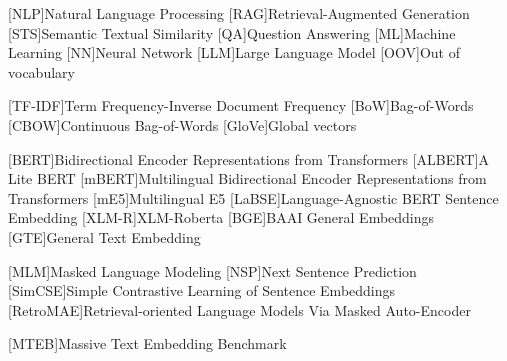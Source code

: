 
\begin{acronym}
  [NLP]{Natural Language Processing}
  [RAG]{Retrieval-Augmented Generation}
  [STS]{Semantic Textual Similarity}
  [QA]{Question Answering}
  [ML]{Machine Learning}
  [NN]{Neural Network}
  [LLM]{Large Language Model}
  [OOV]{Out of vocabulary}

  [TF-IDF]{Term Frequency-Inverse Document Frequency}
  [BoW]{Bag-of-Words}
  [CBOW]{Continuous Bag-of-Words}
  [GloVe]{Global vectors}
  
  [BERT]{Bidirectional Encoder Representations from Transformers}
  [ALBERT]{A Lite BERT}
  [mBERT]{Multilingual Bidirectional Encoder Representations from Transformers}
  [mE5]{Multilingual E5}
  [LaBSE]{Language-Agnostic BERT Sentence Embedding}
  [XLM-R]{XLM-Roberta}
  [BGE]{BAAI General Embeddings}
  [GTE]{General Text Embedding}  

  [MLM]{Masked Language Modeling}
  [NSP]{Next Sentence Prediction}
  [SimCSE]{Simple Contrastive Learning of Sentence Embeddings}
  [RetroMAE]{Retrieval-oriented Language Models Via Masked Auto-Encoder}

  [MTEB]{Massive Text Embedding Benchmark}
\end{acronym}
